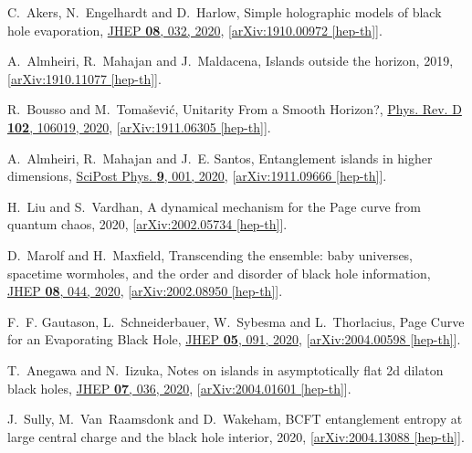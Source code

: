 \documentclass[12pt]{article}
\numberwithin{equation}{section}
\begin{document}
\begin{thebibliography}{10}
C.~Akers, N.~Engelhardt and D.~Harlow, {{Simple holographic models of black
  hole evaporation}}, \href{http://dx.doi.org/10.1007/JHEP08(2020)032}{JHEP
  {\bf 08}, 032, 2020},
  [\href{http://arxiv.org/abs/arXiv:1910.00972}{{arXiv:1910.00972 [hep-th]}}].

A.~Almheiri, R.~Mahajan and J.~Maldacena, {{Islands outside the horizon}},
  2019, [\href{http://arxiv.org/abs/arXiv:1910.11077}{{arXiv:1910.11077
  [hep-th]}}].

R.~Bousso and M.~Toma\v{s}evi\'c, {{Unitarity From a Smooth Horizon?}},
  \href{http://dx.doi.org/10.1103/PhysRevD.102.106019}{Phys. Rev. D {\bf 102},
  106019, 2020},
  [\href{http://arxiv.org/abs/arXiv:1911.06305}{{arXiv:1911.06305 [hep-th]}}].

A.~Almheiri, R.~Mahajan and J.~E. Santos, {{Entanglement islands in higher
  dimensions}}, \href{http://dx.doi.org/10.21468/SciPostPhys.9.1.001}{SciPost
  Phys. {\bf 9}, 001, 2020},
  [\href{http://arxiv.org/abs/arXiv:1911.09666}{{arXiv:1911.09666 [hep-th]}}].

H.~Liu and S.~Vardhan, {{A dynamical mechanism for the Page curve from quantum
  chaos}},  2020,
  [\href{http://arxiv.org/abs/arXiv:2002.05734}{{arXiv:2002.05734 [hep-th]}}].

D.~Marolf and H.~Maxfield, {{Transcending the ensemble: baby universes,
  spacetime wormholes, and the order and disorder of black hole information}},
  \href{http://dx.doi.org/10.1007/JHEP08(2020)044}{JHEP {\bf 08}, 044, 2020},
  [\href{http://arxiv.org/abs/arXiv:2002.08950}{{arXiv:2002.08950 [hep-th]}}].

F.~F. Gautason, L.~Schneiderbauer, W.~Sybesma and L.~Thorlacius, {{Page Curve
  for an Evaporating Black Hole}},
  \href{http://dx.doi.org/10.1007/JHEP05(2020)091}{JHEP {\bf 05}, 091, 2020},
  [\href{http://arxiv.org/abs/arXiv:2004.00598}{{arXiv:2004.00598 [hep-th]}}].

T.~Anegawa and N.~Iizuka, {{Notes on islands in asymptotically flat 2d dilaton
  black holes}}, \href{http://dx.doi.org/10.1007/JHEP07(2020)036}{JHEP {\bf
  07}, 036, 2020},
  [\href{http://arxiv.org/abs/arXiv:2004.01601}{{arXiv:2004.01601 [hep-th]}}].

J.~Sully, M.~Van~Raamsdonk and D.~Wakeham, {{BCFT entanglement entropy at large
  central charge and the black hole interior}},  2020,
  [\href{http://arxiv.org/abs/arXiv:2004.13088}{{arXiv:2004.13088 [hep-th]}}].


\end{thebibliography}
\end{document}
